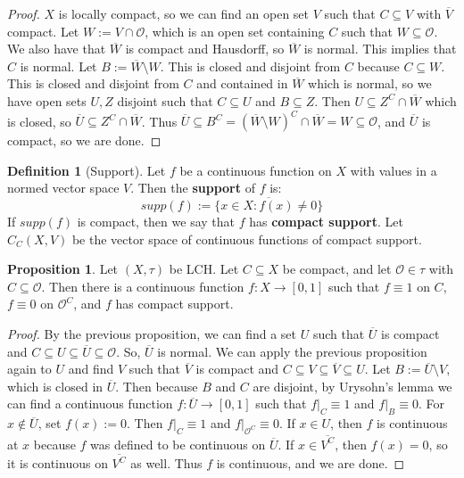 \documentclass[11pt, oneside]{amsart}   	%
\theoremstyle{definition}
\newtheorem{definition}{Definition}[section]
\newtheorem{prop}{Proposition}[section]
\begin{document}
	\begin{proof}
		$X$ is locally compact, so we can find an open set $V$ such that $C\subseteq V$ with $\overline{V}$ compact. 
		Let $W := V\cap \mathcal O$, which is an open set containing $C$ such that $W\subseteq\mathcal O$.  
		We also have that $\overline W$ is compact and Hausdorff, so $\overline W$ is normal. This implies that 
		$C$ is normal. Let $B := \overline W\setminus W$. This is closed and disjoint from $C$ because $C\subseteq W$. 
		This is closed and disjoint from $C$ and contained in $\overline W$ which is normal, so we have open sets 
		$U, Z$ disjoint such that $C\subseteq U$ and $B\subseteq Z$. Then $U\subseteq Z^C\cap\overline W$ which is 
		closed, so $\overline U\subseteq Z^C\cap\overline W$. Thus $\overline U\subseteq B^C = (\overline W\setminus 
		W)^C\cap\overline W = W\subseteq \mathcal O$, and $\overline U$ is compact, so we are done.
	\end{proof}
	
	\begin{definition}[Support]
		Let $f$ be a continuous function on $X$ with values in a normed vector space $V$. Then the \textbf{support} of $f$ 
		is:
		$$
			supp(f) := \overline{\{x\in X : f(x)\neq 0\}}
		$$
		If $supp(f)$ is compact, then we say that $f$ has \textbf{compact support}. Let $C_C(X, V)$ be the vector space of 
		continuous functions of compact support.
	\end{definition}
	
	\begin{prop}
		Let $(X, \tau)$ be LCH. Let $C\subseteq X$ be compact, and let $\mathcal O\in\tau$ with $C\subseteq\mathcal O$. 
		Then there is a continuous function $f : X\rightarrow [0, 1]$ such that $f\equiv 1$ on $C$, $f\equiv 0$ on $\mathcal
		 O^C$, and $f$ has compact support. 
	\end{prop}
	
	\begin{proof}
		By the previous proposition, we can find a set $U$ such that $\overline U$ is compact and $C\subseteq U\subseteq
		\overline U\subseteq \mathcal O$. So, $\overline U$ is normal. We can apply the previous proposition again 
		to $U$ and find $V$ such that $\overline V$ is compact and $C\subseteq V\subseteq\overline V\subseteq U$. 
		Let $B := \overline U\setminus V$, which is closed in $\overline U$. Then because $B$ and $C$ are disjoint, 
		by Urysohn's lemma we can find a continuous function $f : \overline U\rightarrow [0, 1]$ such that $f|_C\equiv 1$ 
		and $f|_B\equiv 0$. For $x\notin\overline U$, set $f(x) := 0$. Then $f|_C\equiv 1$ and $f|_{\mathcal O^C}\equiv 
		0$. If $x\in U$, then $f$ is continuous at $x$ because $f$ was defined to be continuous on $\overline U$. If 
		$x\in \overline{V^C}$, then $f(x) = 0$, so it is continuous on $\overline{V^C}$ as well. Thus $f$ is continuous, 
		and we are done.
	\end{proof}
\end{document}

